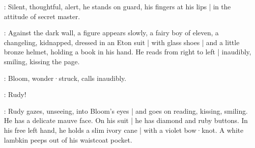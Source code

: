 :
Silent,
thoughtful,
alert,
he stands on guard,
his fingers at his lips |
in the attitude of secret master.

:
Against the dark wall,
a figure appears slowly,
a fairy boy of eleven,
a changeling,
kidnapped,
dressed in an Eton suit |
with glass shoes |
and a little bronze helmet,
holding a book in his hand.
He reads from right to left |
inaudibly,
smiling,
kissing the page.%

:
Bloom,
wonder·struck,
calls inaudibly.

\Bloom:
Rudy!

:
Rudy gazes,
unseeing,
into Bloom's eyes |
and goes on reading,
kissing,
smiling.
He has a delicate mauve face.
On his suit |
he has diamond and ruby buttons.
In his free left hand,
he holds a slim ivory cane |
with a violet bow·knot.
A white lambkin peeps out of his waistcoat pocket.

